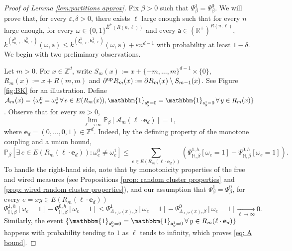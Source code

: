 \documentclass[11pt,a4paper]{article}
\numberwithin{equation}{section}
\theoremstyle{plain}
\theoremstyle{definition}
\begin{document}
\begin{proof}[Proof of Lemma \textup{\ref{lem:partitions approx}}] Fix $\beta>0$ such that $\Psi^1_\beta=\Psi^0_\beta$. 
We will prove that, for every $\varepsilon,\delta > 0$, there exists $\ell$ large enough such that for every $n$ large enough, for every $\omega\in \{0,1\}^{\overline E^+(R(n,\ell))}$ and every $\mathsf{a}\in (\mathbb{R}^+)^{R(n,\ell)}$, 
$\overline{k}^{(\xi^0_{n,\ell},\mathsf{b}^0_{n,\ell})}(\omega,\mathsf{a}) \leq \overline{k}^{(\xi^1_{n,\ell},\mathsf{b}^1_{n,\ell})}(\omega,\mathsf{a}) + \varepsilon n^{d-1}$ with probability at least $1-\delta$. We begin with two preliminary observations.

\vspace{5pt}

Let $m>0$. For $x\in \mathbb{Z}^d$, write $S_m(x):=x+\{-m,\ldots,m\}^{d-1}\times\{0\}$, $R_m(x):=x+R(m,m)$ and $\partial^{\textup{up}}R_m(x):=\partial R_m(x)\setminus S_{m-1}(x)$. See Figure \ref{fig:BK} for an illustration. Define $\mathcal{A}_m(x)=\{\omega^0_e=\omega^1_e \, \forall \, e\in E(R_m(x)), \mathbbm{1}_{\mathsf{a}^0_y=0}=\mathbbm{1}_{\mathsf{a}^1_y=0} \, \forall \, y\in R_m(x)\}$. Observe that for every $m>0$, 
\begin{equation}\label{eq: A bound}
\lim_{\ell\to\infty}\mathbb{P}_{\beta}[\mathcal{A}_m(\ell \cdot \mathbf{e}_d)]=1,
\end{equation}
where $\mathbf{e}_d=(0,\ldots,0,1)\in \mathbb{Z}^d$.
Indeed, by the defining property of the monotone coupling and a union bound,
\begin{equation}
\mathbb{P}_{\beta}[\exists \, e\in E(R_m(\ell\cdot \mathbf{e}_d)): \omega^0_e\neq \omega^1_e]\le \sum_{e\in E(R_m(\ell\cdot \mathbf{e}_d))}\left(\Psi^{1,h}_{\mathbb{H},\beta}[\omega_e=1]-\Psi^{0,h}_{\mathbb{H},\beta}[\omega_e=1]\right).
\end{equation}
To handle the right-hand side, note that by monotonicity properties of the free and wired measures (see Propositions \ref{prop: random cluster properties} and \ref{prop: wired random cluster properties}), and our assumption that $\Psi^1_{\beta}=\Psi^0_{\beta}$, for every $e=xy\in E(R_m(\ell\cdot \mathbf{e}_d))$
\begin{equation}
\Psi^{1,h}_{\mathbb{H},\beta}[\omega_e=1]-\Psi^{0,h}_{\mathbb{H},\beta}[\omega_e=1]\le \Psi^1_{\Lambda_{\ell/2}(x),\beta}[\omega_e=1]-\Psi^0_{\Lambda_{\ell/2}(x),\beta}[\omega_e=1]\underset{\ell\rightarrow \infty}{\longrightarrow} 0.
\end{equation}
Similarly, the event $\{\mathbbm{1}_{\mathsf{a}^0_y=0}=\mathbbm{1}_{\mathsf{a}^1_y=0} \, \forall \, y\in R_m(\ell \cdot \mathbf{e}_d)\}$ happens with probability tending to $1$ as $\ell$ tends to infinity, which proves \eqref{eq: A bound}.


\end{proof}
\end{document}
